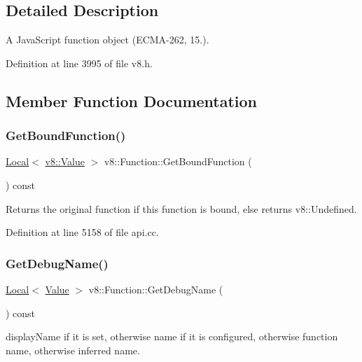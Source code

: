 \subsection{Detailed Description}
A Java\+Script function object (E\+C\+M\+A-\/262, 15.). 

Definition at line 3995 of file v8.\+h.



\subsection{Member Function Documentation}
\mbox{\label{classv8_1_1Function_ac3b4ea43e40fedfa17e871bdfbb9517e}} 
\subsubsection{\texorpdfstring{Get\+Bound\+Function()}{GetBoundFunction()}}
{\footnotesize\ttfamily \mbox{\hyperlink{classv8_1_1Local}{Local}}$<$ \mbox{\hyperlink{classv8_1_1Value}{v8\+::\+Value}} $>$ v8\+::\+Function\+::\+Get\+Bound\+Function (\begin{DoxyParamCaption}{ }\end{DoxyParamCaption}) const}

Returns the original function if this function is bound, else returns v8\+::\+Undefined. 

Definition at line 5158 of file api.\+cc.

\mbox{\label{classv8_1_1Function_af2792776825eb0016b0a855dbcb6c5ff}} 
\subsubsection{\texorpdfstring{Get\+Debug\+Name()}{GetDebugName()}}
{\footnotesize\ttfamily \mbox{\hyperlink{classv8_1_1Local}{Local}}$<$ \mbox{\hyperlink{classv8_1_1Value}{Value}} $>$ v8\+::\+Function\+::\+Get\+Debug\+Name (\begin{DoxyParamCaption}{ }\end{DoxyParamCaption}) const}

display\+Name if it is set, otherwise name if it is configured, otherwise function name, otherwise inferred name. 

